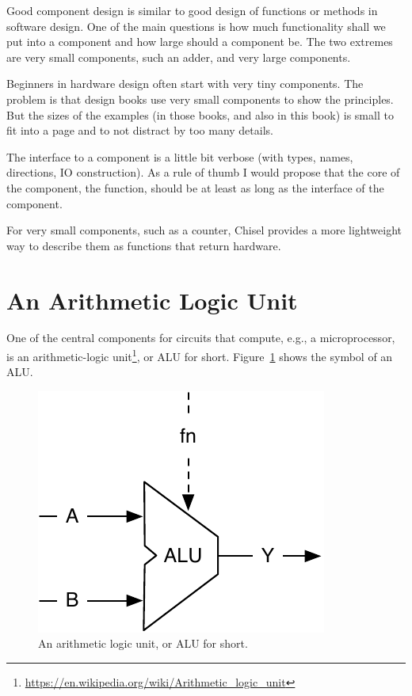 \documentclass[%
    10pt,
    headinclude, footexclude,
    openright, %
    notitlepage,
    cleardoubleempty,
    headsepline,
    pointlessnumbers,
    bibtotoc, idxtotoc,
    ]{scrbook}
\newcommand{\scale}{0.7}
\newcommand{\myref}[2]{\href{#1}{#2}}
\renewcommand{\myref}[2]{{#2}{\footnote{\url{#1}}}}
\begin{document}

Good component design is similar to good design of functions or methods in
software design. One of the main questions is how much functionality shall we put into
a component and how large should a component be. The two extremes are very
small components, such an adder, and very large components.

Beginners in hardware design often start with very tiny components.
The problem is that design books use very small components to show the principles.
But the sizes of the examples (in those books, and also in this book) is small
to fit into a page and to not distract by too many details.

The interface to a component is a little bit verbose (with types, names, directions,
IO construction). As a rule of thumb I would propose that the core of the component,
the function, should be at least as long as the interface of the component.

For very small components, such as a counter, Chisel provides a more lightweight
way to describe them as functions that return hardware.


\section{An Arithmetic Logic Unit}

One of the central components for circuits that compute, e.g., a microprocessor, is an
\myref{https://en.wikipedia.org/wiki/Arithmetic_logic_unit}{arithmetic-logic unit},
or ALU for short. Figure~\ref{fig:alu} shows the symbol of an ALU.

\begin{figure}
  \centering
  \includegraphics[scale=\scale]{figures/alu}
  \caption{An arithmetic logic unit, or ALU for short.}
  \label{fig:alu}
\end{figure}
\end{document}
